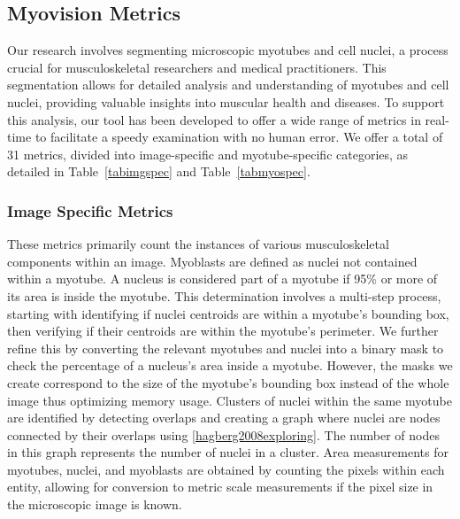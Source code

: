 \subsection{Myovision Metrics}
Our research involves segmenting microscopic myotubes and cell nuclei, a process crucial for musculoskeletal researchers and medical practitioners. This segmentation allows for detailed analysis and understanding of myotubes and cell nuclei, providing valuable insights into muscular health and diseases. To support this analysis, our tool has been developed to offer a wide range of metrics in real-time to facilitate a speedy examination with no human error. We offer a total of 31 metrics, divided into image-specific and myotube-specific categories, as detailed in Table~\ref{tabimgspec} and Table~\ref{tabmyospec}.
\subsubsection{Image Specific Metrics}
These metrics primarily count the instances of various musculoskeletal components within an image. Myoblasts are defined as nuclei not contained within a myotube. A nucleus is considered part of a myotube if 95\% or more of its area is inside the myotube. This determination involves a multi-step process, starting with identifying if nuclei centroids are within a myotube's bounding box, then verifying if their centroids are within the myotube's perimeter. We further refine this by converting the relevant myotubes and nuclei into a binary mask to check the percentage of a nucleus's area inside a myotube. However, the masks we create correspond to the size of the myotube’s bounding box instead of the whole image thus optimizing memory usage. Clusters of nuclei within the same myotube are identified by detecting overlaps and creating a graph where nuclei are nodes connected by their overlaps using \ref{hagberg2008exploring}. The number of nodes in this graph represents the number of nuclei in a cluster. Area measurements for myotubes, nuclei, and myoblasts are obtained by counting the pixels within each entity, allowing for conversion to metric scale measurements if the pixel size in the microscopic image is known.
